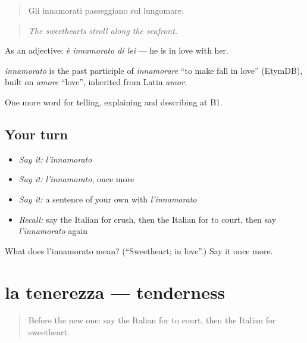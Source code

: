 \begin{quote}
Gli innamorati passeggiano sul lungomare.
\end{quote}

\begin{quote}
\emph{The sweethearts stroll along the seafront.}
\end{quote}

As an adjective: \emph{è innamorato di lei} — he is in love with her.

\begin{cousinweb}
\emph{innamorato} is the past participle of \emph{innamorare} \textquotedblleft{}to make fall in love\textquotedblright{} (EtymDB), built on \emph{amore} \textquotedblleft{}love\textquotedblright{}, inherited from Latin \emph{amor}.
\end{cousinweb}

\begin{grammarlens}[title={What you've built}]
One more word for telling, explaining and describing at B1.
\end{grammarlens}

\subsection*{Your turn}
\begin{itemize}
\raggedright
  \item \emph{Say it:} \emph{l'innamorato}
  \item \emph{Say it:} \emph{l'innamorato}, once more
  \item \emph{Say it:} a sentence of your own with \emph{l'innamorato}
  \item \emph{Recall:} say the Italian for crush, then the Italian for to court, then say \emph{l'innamorato} again
\end{itemize}

\begin{tcolorbox}[breakable,colback=teal!4,colframe=teal!35!black,title={Before you move on}]
What does l'innamorato mean? (\textquotedblleft{}Sweetheart; in love\textquotedblright{}.) Say it once more.
\end{tcolorbox}
\section[la tenerezza]{la tenerezza — tenderness}

\label{lesson:IT-C491-tenerezza}



\begin{quote}
Before the new one: say the Italian for to court, then the Italian for sweetheart.
\end{quote}

